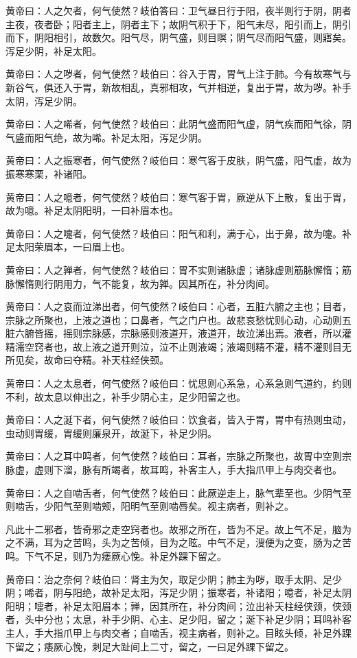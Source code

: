 \documentclass[a4paper,12pt,UTF8,twoside]{ctexbook}
\begin{document}
	黄帝曰：人之欠者，何气使然？岐伯答曰：卫气昼日行于阳，夜半则行于阴，阴者主夜，夜者卧；阳者主上，阴者主下；故阴气积于下，阳气未尽，阳引而上，阴引而下，阴阳相引，故数欠。阳气尽，阴气盛，则目瞑；阴气尽而阳气盛，则寤矣。泻足少阴，补足太阳。
	
	黄帝曰：人之哕者，何气使然？岐伯曰：谷入于胃，胃气上注于肺。今有故寒气与新谷气，俱还入于胃，新故相乱，真邪相攻，气并相逆，复出于胃，故为哕。补手太阴，泻足少阴。
	
	黄帝曰：人之唏者，何气使然？岐伯曰：此阴气盛而阳气虚，阴气疾而阳气徐，阴气盛而阳气绝，故为唏。补足太阳，泻足少阴。
	
	黄帝曰：人之振寒者，何气使然？岐伯曰：寒气客于皮肤，阴气盛，阳气虚，故为振寒寒栗，补诸阳。
	
	黄帝曰：人之噫者，何气使然？岐伯曰：寒气客于胃，厥逆从下上散，复出于胃，故为噫。补足太阴阳明，一曰补眉本也。
	
	黄帝曰：人之嚏者，何气使然？岐伯曰：阳气和利，满于心，出于鼻，故为嚏。补足太阳荣眉本，一曰眉上也。
	
	黄帝曰：人之亸者，何气使然？岐伯曰：胃不实则诸脉虚；诸脉虚则筋脉懈惰；筋脉懈惰则行阴用力，气不能复，故为亸。因其所在，补分肉间。
	
	黄帝曰：人之哀而泣涕出者，何气使然？岐伯曰：心者，五脏六腑之主也；目者，宗脉之所聚也，上液之道也；口鼻者，气之门户也。故悲哀愁忧则心动，心动则五脏六腑皆摇，摇则宗脉感，宗脉感则液道开，液道开，故泣涕出焉。液者，所以灌精濡空窍者也，故上液之道开则泣，泣不止则液竭；液竭则精不灌，精不灌则目无所见矣，故命曰夺精。补天柱经侠颈。
	
	黄帝曰：人之太息者，何气使然？岐伯曰：忧思则心系急，心系急则气道约，约则不利，故太息以伸出之，补手少阴心主，足少阳留之也。
	
	黄帝曰：人之涎下者，何气使然？岐伯曰：饮食者，皆入于胃，胃中有热则虫动，虫动则胃缓，胃缓则廉泉开，故涎下，补足少阴。
	
	黄帝曰：人之耳中鸣者，何气使然？岐伯曰：耳者，宗脉之所聚也，故胃中空则宗脉虚，虚则下溜，脉有所竭者，故耳鸣，补客主人，手大指爪甲上与肉交者也。
	
	黄帝曰：人之自啮舌者，何气使然？岐伯曰：此厥逆走上，脉气辈至也。少阴气至则啮舌，少阳气至则啮颊，阳明气至则啮唇矣。视主病者，则补之。
	
	凡此十二邪者，皆奇邪之走空窍者也。故邪之所在，皆为不足。故上气不足，脑为之不满，耳为之苦鸣，头为之苦倾，目为之眩。中气不足，溲便为之变，肠为之苦鸣。下气不足，则乃为痿厥心悗。补足外踝下留之。
	
	黄帝曰：治之奈何？岐伯曰：肾主为欠，取足少阴；肺主为哕，取手太阴、足少阴；唏者，阴与阳绝，故补足太阳，泻足少阴；振寒者，补诸阳；噫者，补足太阴阳明；嚏者，补足太阳眉本；亸，因其所在，补分肉间；泣出补天柱经侠颈，侠颈者，头中分也；太息，补手少阴、心主、足少阳，留之；涎下补足少阴；耳鸣补客主人，手大指爪甲上与肉交者；自啮舌，视主病者，则补之。目眩头倾，补足外踝下留之；痿厥心悗，刺足大趾间上二寸，留之，一曰足外踝下留之。
	
\end{document}
